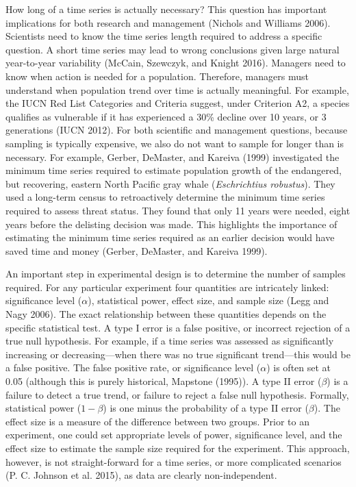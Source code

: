 \documentclass[12pt,]{article}
\begin{document}
How long of a time series is actually necessary? This question has
important implications for both research and management (Nichols and
Williams 2006). Scientists need to know the time series length required
to address a specific question. A short time series may lead to wrong
conclusions given large natural year-to-year variability (McCain,
Szewczyk, and Knight 2016). Managers need to know when action is needed
for a population. Therefore, managers must understand when population
trend over time is actually meaningful. For example, the IUCN Red List
Categories and Criteria suggest, under Criterion A2, a species qualifies
as vulnerable if it has experienced a 30\% decline over 10 years, or 3
generations (IUCN 2012). For both scientific and management questions,
because sampling is typically expensive, we also do not want to sample
for longer than is necessary. For example, Gerber, DeMaster, and Kareiva
(1999) investigated the minimum time series required to estimate
population growth of the endangered, but recovering, eastern North
Pacific gray whale (\emph{Eschrichtius robustus}). They used a long-term
census to retroactively determine the minimum time series required to
assess threat status. They found that only 11 years were needed, eight
years before the delisting decision was made. This highlights the
importance of estimating the minimum time series required as an earlier
decision would have saved time and money (Gerber, DeMaster, and Kareiva
1999).

An important step in experimental design is to determine the number of
samples required. For any particular experiment four quantities are
intricately linked: significance level (\(\alpha\)), statistical power,
effect size, and sample size (Legg and Nagy 2006). The exact
relationship between these quantities depends on the specific
statistical test. A type I error is a false positive, or incorrect
rejection of a true null hypothesis. For example, if a time series was
assessed as significantly increasing or decreasing---when there was no
true significant trend---this would be a false positive. The false
positive rate, or significance level (\(\alpha\)) is often set at 0.05
(although this is purely historical, Mapstone (1995)). A type II error
(\(\beta\)) is a failure to detect a true trend, or failure to reject a
false null hypothesis. Formally, statistical power (\(1-\beta\)) is one
minus the probability of a type II error (\(\beta\)). The effect size is
a measure of the difference between two groups. Prior to an experiment,
one could set appropriate levels of power, significance level, and the
effect size to estimate the sample size required for the experiment.
This approach, however, is not straight-forward for a time series, or
more complicated scenarios (P. C. Johnson et al. 2015), as data are
clearly non-independent.
\end{document}
